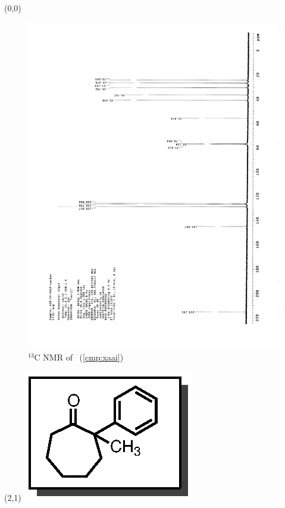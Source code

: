 \clearpage
\begin{textblock}{20}(0,0)
\begin{figure}[htb]
\caption{$^{13}$C NMR of  \CMPxaai\ (\ref{cmp:xaai})}
\includegraphics[scale=0.75, trim = 0mm 0mm 0mm 5mm,
clip]{chp_asymmetric/images/nmr/xaaiC}
\vspace{-100pt}
\end{figure}
\end{textblock}
\begin{textblock}{1}(2,1)
\includegraphics[scale=0.8, angle=90]{chp_asymmetric/images/xaai}
\end{textblock}
\clearpage

